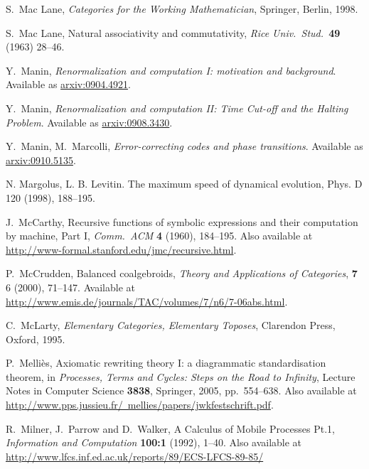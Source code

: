 \documentclass[12pt,twoside,openright]{report}
\begin{document}
\begin{thebibliography}{99}
 S.\ Mac Lane, {\sl Categories for the Working Mathematician}, Springer, Berlin, 1998.

 S.\ Mac Lane, Natural associativity and commutativity, {\sl Rice Univ.\ Stud.\ }{\bf 49} (1963) 28--46.

 Y.\ Manin, \textsl{Renormalization and computation I: motivation and background}.  Available as
\href{http://arxiv.org/abs/0904.4921}{arxiv:0904.4921}.

 Y.\ Manin, \textsl{Renormalization and computation II: Time Cut-off and the Halting Problem}. Available as
\href{http://arxiv.org/abs/0908.3430}{arxiv:0908.3430}.

 Y.\ Manin, M.\ Marcolli, \textsl{Error-correcting codes and phase transitions}. Available as
\href{http://arxiv.org/abs/0910.5135}{arxiv:0910.5135}.

 N. Margolus, L. B. Levitin. The maximum speed of dynamical evolution, Phys. D 120 (1998), 188--195.

 J.\ McCarthy, Recursive functions of symbolic expressions and their computation by machine, Part I, 
{\sl Comm.\ ACM} {\bf 4} (1960), 184--195.  Also available at 
\href{http://www-formal.stanford.edu/jmc/recursive.html}
{http://www-formal.stanford.edu/jmc/recursive.html}.

 P.\ McCrudden, Balanced coalgebroids, \textsl{Theory and Applications of Categories}, \textbf{7} 6 (2000), 71--147.  Available at \href{http://www.emis.de/journals/TAC/volumes/7/n6/7-06abs.html}{http://www.emis.de/journals/TAC/volumes/7/n6/7-06abs.html}.

 C.\ McLarty, {\sl Elementary Categories, Elementary Toposes}, Clarendon Press, Oxford, 1995.

 P.\ Melli\`es, Axiomatic rewriting theory I: a diagrammatic standardisation theorem, in {\sl Processes, Terms and Cycles: Steps on the Road to Infinity}, Lecture Notes in Computer Science {\bf 3838}, Springer, 2005, pp.\ 554--638.  Also available at 
\href{http://www.pps.jussieu.fr/~mellies/papers/jwkfestschrift.pdf}
{http://www.pps.jussieu.fr/~mellies/papers/jwkfestschrift.pdf}.

 R.\ Milner, J.\ Parrow and D.\ Walker, A Calculus of Mobile Processes Pt.1, {\sl Information and Computation} {\bf 100:1} (1992), 1--40. Also available at \href{http://www.lfcs.inf.ed.ac.uk/reports/89/ECS-LFCS-89-85/}{http://www.lfcs.inf.ed.ac.uk/reports/89/ECS-LFCS-89-85/}


\end{thebibliography}
\end{document}

